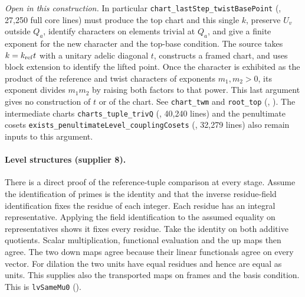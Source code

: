 \emph{Open in this construction.} In particular
\nolinkurl{chart_lastStep_twistBasePoint}
(, 27,250 full core lines)
must produce the top chart and this single $k$, preserve $U_v$ outside
$Q_a$, identify characters on elements trivial at $Q_a$, and give a
finite exponent for the new character and the top-base condition.
The source takes $k=k_{\rm ref}t$ with a unitary adelic diagonal $t$,
constructs a framed chart, and uses block extension to identify the lifted
point. Once the character is exhibited as the product of the reference and
twist characters of exponents $m_1,m_2>0$, its exponent divides $m_1m_2$
by raising both factors to that power. This last argument gives no
construction of $t$ or of the chart. See \nolinkurl{chart_twm} and
\nolinkurl{root_top} (,
).
The intermediate charts \nolinkurl{charts_tuple_trivQ}
(, 40,240 lines) and the penultimate
cosets \nolinkurl{exists_penultimateLevel_couplingCosets}
(,
32,279 lines) also remain inputs to this argument.

\paragraph{Level structures (supplier 8).}
There is a direct proof of the reference-tuple comparison at every stage.
Assume the identification of primes is the identity and that the inverse
residue-field identification fixes the residue of each integer.
Each residue has an integral representative. Applying the field
identification to the assumed equality on representatives shows it fixes
every residue. Take the identity on both additive quotients. Scalar
multiplication, functional evaluation and the up maps then agree. The two
down maps agree because their linear functionals agree on every vector.
For dilation the two units have equal residues and hence are equal as
units. This supplies also the transported maps on frames and the
basis condition. This is \nolinkurl{lvSameMu0}
().


